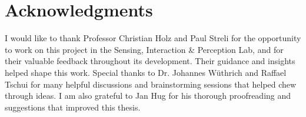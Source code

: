 \section{Acknowledgments}
\label{sec:acknowledgments}

I would like to thank Professor Christian Holz and Paul Streli for the opportunity to work on this project in the Sensing, Interaction \& Perception Lab, and for their valuable feedback throughout its development. 
Their guidance and insights helped shape this work.
Special thanks to Dr. Johannes Wüthrich and Raffael Tschui for many helpful discussions and brainstorming sessions that helped chew through ideas.
I am also grateful to Jan Hug for his thorough proofreading and suggestions that improved this thesis.